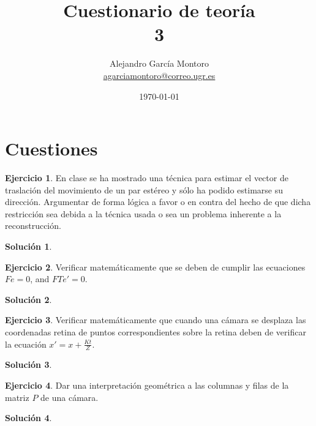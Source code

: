 \documentclass[a4paper, 11pt]{article}
\title{Cuestionario de teoría \\ 3}
\author{Alejandro García Montoro\\
    \href{mailto:agarciamontoro@correo.ugr.es}{agarciamontoro@correo.ugr.es}}
\date{\today}
\theoremstyle{definition}
\newtheorem{ejercicio}{Ejercicio}
\newtheorem*{solucion}{Solución}
\theoremstyle{theorem}
\begin{document}
    \maketitle

    \section{Cuestiones}

    \begin{ejercicio}
        En clase se ha mostrado una técnica para estimar el vector de traslación del movimiento de un par estéreo y sólo ha podido estimarse su dirección. Argumentar de forma lógica a favor o en contra del hecho de que dicha restricción sea debida a la técnica usada o sea un problema inherente a la reconstrucción.
    \end{ejercicio}

    \begin{solucion}

    \end{solucion}

    \begin{ejercicio}
        Verificar matemáticamente que se deben de cumplir las ecuaciones $Fe = 0$, and $F T e' = 0$.
    \end{ejercicio}

    \begin{solucion}

    \end{solucion}

    \begin{ejercicio}
        Verificar matemáticamente que cuando una cámara se desplaza las coordenadas retina de puntos correspondientes sobre la retina deben de verificar la ecuación $x'= x + \frac{Kt}{Z}$.
    \end{ejercicio}

    \begin{solucion}

    \end{solucion}

    \begin{ejercicio}
        Dar una interpretación geométrica a las columnas y filas de la matriz $P$ de una cámara.
    \end{ejercicio}

    \begin{solucion}

    \end{solucion}
\end{document}
